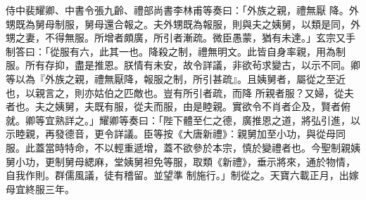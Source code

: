 \begin{pinyinscope}
 侍中裴耀卿、中書令張九齡、禮部尚書李林甫等奏曰：「外族之親，禮無厭
 降。外甥既為舅母制服，舅母還合報之。夫外甥既為報服，則與夫之姨舅，以類是同，外甥之妻，不得無服。所增者頗廣，所引者漸疏。微臣愚蒙，猶有未達。」玄宗又手制答曰：「從服有六，此其一也。降殺之制，禮無明文。此皆自身率親，用為制服。所有存抑，盡是推恩。朕情有未安，故令詳議，非欲茍求變古，以示不同。卿等以為『外族之親，禮無厭降，報服之制，所引甚疏』。且姨舅者，屬從之至近也，以親言之，則亦姑伯之匹敵也。豈有所引者疏，而降
 所親者服？又婦，從夫者也。夫之姨舅，夫既有服，從夫而服，由是睦親。實欲令不肖者企及，賢者俯就。卿等宜熟詳之。」耀卿等奏曰：「陛下體至仁之德，廣推恩之道，將弘引進，以示睦親，再發德音，更令詳議。臣等按《大唐新禮》：親舅加至小功，與從母同服。此蓋當時特命，不以輕重遞增，蓋不欲參於本宗，慎於變禮者也。今聖制親姨舅小功，更制舅母緦麻，堂姨舅袒免等服，取類《新禮》，垂示將來，通於物情，自我作則。群儒風議，徒有稽留。並望準
 制施行。」制從之。天寶六載正月，出嫁母宜終服三年。



\end{pinyinscope}